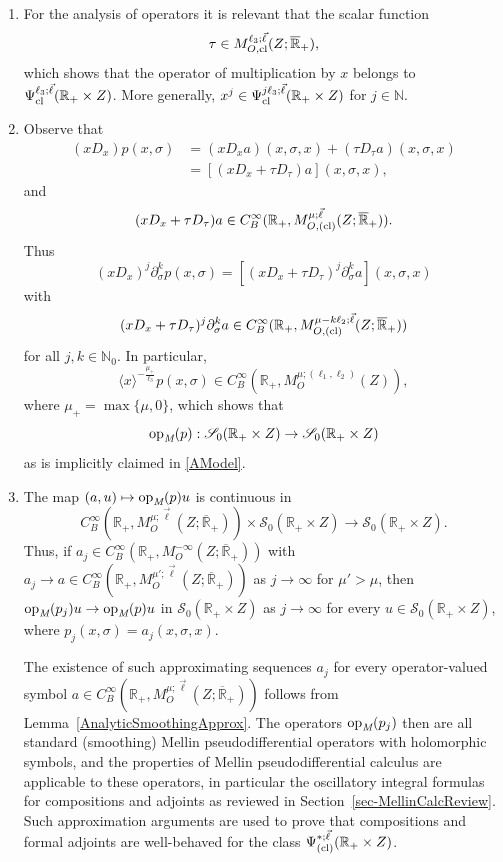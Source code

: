 \documentclass[reqno]{amsart}
\numberwithin{equation}{section}
\theoremstyle{definition}
\def\N{\mathbb N}
\def\R{\mathbb R}
\def\S{\mathscr S}
\def\opm{\textup{op}_{\textit{M}}}
\begin{document}
\begin{enumerate}
\item For the analysis of operators it is relevant that the scalar function
$$
\tau \in M_{O,\textup{cl}}^{\ell_3;\vec{\ell}}(Z;\overline{\R}_+),
$$
which shows that the operator of multiplication by $x$ belongs to $\Psi^{\ell_3;\vec{\ell}}_{\textup{cl}}(\R_+\times Z)$. More generally, $x^j \in \Psi^{j\ell_3;\vec{\ell}}_{\textup{cl}}(\R_+\times Z)$ for $j \in \N$.

\item Observe that
\begin{align*}
(xD_x)p(x,\sigma) &= (xD_x a)(x,\sigma,x) + (\tau D_{\tau}a)(x,\sigma,x) \\
&= [(xD_x  + \tau D_{\tau}) a](x,\sigma,x),
\end{align*}
and
$$
(xD_x  + \tau D_{\tau}) a \in C_B^{\infty}(\R_+,M_{O,\textup{(cl)}}^{\mu;\vec{\ell}}(Z;\overline{\R}_+)).
$$
Thus
$$
(xD_x)^j\partial_{\sigma}^k p(x,\sigma) = [(xD_x  + \tau D_{\tau})^j\partial_{\sigma}^k a](x,\sigma,x)
$$
with
$$
(xD_x  + \tau D_{\tau})^j\partial_{\sigma}^k a \in C_B^{\infty}(\R_+,M_{O,\textup{(cl)}}^{\mu-k\ell_2;\vec{\ell}}(Z;\overline{\R}_+))
$$
for all $j,k \in \N_0$. In particular,
$$
\langle x \rangle^{-\frac{\mu_+}{\ell_3}}p(x,\sigma) \in C_B^{\infty}(\R_+,M_O^{\mu;(\ell_1,\ell_2)}(Z)),
$$
where $\mu_+ = \max\{\mu,0\}$, which shows that
$$
\opm(p) : \S_0(\R_+\times Z) \to \S_0(\R_+ \times Z)
$$
as is implicitly claimed in \eqref{AModel}.

\item The map $(a,u) \mapsto \opm(p)u$ is continuous in
$$
C_B^{\infty}(\R_+,M_{O}^{\mu;\vec{\ell}}(Z;\overline{\R}_+)) \times \S_0(\R_+ \times Z) \to \S_0(\R_+ \times Z).
$$
Thus, if $a_j \in C_B^{\infty}(\R_+,M_{O}^{-\infty}(Z;\overline{\R}_+))$ with $a_j \to a \in C_B^{\infty}(\R_+,M_{O}^{\mu';\vec{\ell}}(Z;\overline{\R}_+))$ as $j \to \infty$ for $\mu' > \mu$, then $\opm(p_j)u \to \opm(p)u$ in $\S_0(\R_+ \times Z)$ as $j \to \infty$ for every $u \in \S_0(\R_+\times Z)$, where $p_j(x,\sigma) = a_j(x,\sigma,x)$.

The existence of such approximating sequences $a_j$ for every operator-valued symbol $a \in C_B^{\infty}(\R_+,M_{O}^{\mu;\vec{\ell}}(Z;\overline{\R}_+))$ follows from Lemma~\ref{AnalyticSmoothingApprox}. The operators $\opm(p_j)$ then are all standard (smoothing) Mellin pseudodifferential operators with holomorphic symbols, and the properties of Mellin pseudodifferential calculus are applicable to these operators, in particular the oscillatory integral formulas for compositions and adjoints as reviewed in Section~\ref{sec-MellinCalcReview}. Such approximation arguments are used to prove that compositions and formal adjoints are well-behaved for the class $\Psi^{\ast;\vec{\ell}}_{\textup{(cl)}}(\R_+\times Z)$.
\end{enumerate}
\end{document}
